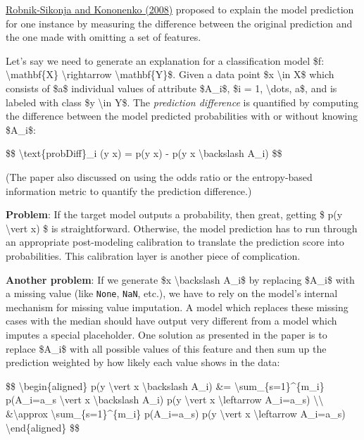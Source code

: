 \href{http://lkm.fri.uni-lj.si/rmarko/papers/RobnikSikonjaKononenko08-TKDE.pdf}{Robnik-Sikonja and Kononenko (2008)} proposed to explain the model prediction for one instance by measuring the difference between the original prediction and the one made with omitting a set of features.

Let's say we need to generate an explanation for a classification model \$f: \textbackslash mathbf\{X\} \textbackslash rightarrow \textbackslash mathbf\{Y\}\$. Given a data point \$x \textbackslash in X\$ which consists of \$a\$ individual values of attribute \$A\_i\$, \$i = 1, \textbackslash dots, a\$, and is labeled with class \$y \textbackslash in Y\$. The \emph{prediction difference} is quantified by computing the difference between the model predicted probabilities with or without knowing \$A\_i\$:

\$\$ \textbackslash text\{probDiff\}\_i (y \textbar{} x) = p(y\textbar{} x) - p(y \textbar{} x \textbackslash backslash A\_i) \$\$

(The paper also discussed on using the odds ratio or the entropy-based information metric to quantify the prediction difference.)

\textbf{Problem}: If the target model outputs a probability, then great, getting \$ p(y \textbackslash vert x) \$ is straightforward. Otherwise, the model prediction has to run through an appropriate post-modeling calibration to translate the prediction score into probabilities. This calibration layer is another piece of complication.

\textbf{Another problem}: If we generate \$x \textbackslash backslash A\_i\$ by replacing \$A\_i\$ with a missing value (like \texttt{None}, \texttt{NaN}, etc.), we have to rely on the model's internal mechanism for missing value imputation. A model which replaces these missing cases with the median should have output very different from a model which imputes a special placeholder. One solution as presented in the paper is to replace \$A\_i\$ with all possible values of this feature and then sum up the prediction weighted by how likely each value shows in the data:

\$\$ \textbackslash begin\{aligned\} p(y \textbackslash vert x \textbackslash backslash A\_i) \&= \textbackslash sum\_\{s=1\}\^{}\{m\_i\} p(A\_i=a\_s \textbackslash vert x \textbackslash backslash A\_i) p(y \textbackslash vert x \textbackslash leftarrow A\_i=a\_s) \textbackslash\textbackslash{} \&\textbackslash approx \textbackslash sum\_\{s=1\}\^{}\{m\_i\} p(A\_i=a\_s) p(y \textbackslash vert x \textbackslash leftarrow A\_i=a\_s) \textbackslash end\{aligned\} \$\$

